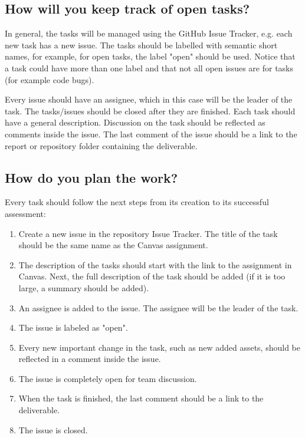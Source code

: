 \documentclass{article}
\begin{document}
\subsection{How will you keep track of open tasks?}

In general, the tasks will be managed using the GitHub Issue Tracker, e.g. each new task has a new issue. The tasks should be labelled with semantic short names, for example, for open tasks, the label "open" should be used. Notice that a task could have more than one label and that not all open issues are for tasks (for example code bugs). 

Every issue should have an assignee, which in this case will be the leader of the task. The tasks/issues should be closed after they are finished. Each task should have a general description. Discussion on the task should be reflected as comments inside the issue. The last comment of the issue should be a link to the report or repository folder containing the deliverable.


\subsection{How do you plan the work?}

Every task should follow the next steps from its creation to its successful assessment:

\begin{enumerate}
    \item Create a new issue in the repository Issue Tracker. The title of the task should be the same name as the Canvas assignment.
    \item The description of the tasks should start with the link to the assignment in Canvas. Next, the full description of the task should be added (if it is too large, a summary should be added).
    \item An assignee is added to the issue. The assignee will be the leader of the task.
    \item The issue is labeled as "open".
    \item Every new important change in the task, such as new added assets, should be reflected in a comment inside the issue. 
    \item The issue is completely open for team discussion.
    \item When the task is finished, the last comment should be a link to the deliverable.
    \item The issue is closed.
\end{enumerate}
\end{document}
